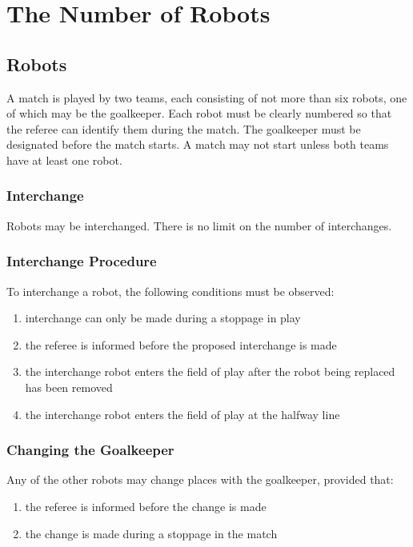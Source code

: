 \section{The Number of Robots}\label{sec:number-of-robots}

\subsection{Robots}
A match is played by two teams, each consisting of not more than six robots, one of which may be the goalkeeper.
Each robot must be clearly numbered so that the referee can identify them during the match.
The goalkeeper must be designated before the match starts.
A match may not start unless both teams have at least one robot.

\subsubsection{Interchange}
Robots may be interchanged.
There is no limit on the number of interchanges.

\subsubsection{Interchange Procedure}
To interchange a robot, the following conditions must be observed:
\begin{enumerate}
\item interchange can only be made during a stoppage in play
\item the referee is informed before the proposed interchange is made
\item the interchange robot enters the field of play after the robot being replaced has been removed
\item the interchange robot enters the field of play at the halfway line
\end{enumerate}

\subsubsection{Changing the Goalkeeper}
Any of the other robots may change places with the goalkeeper, provided that:
\begin{enumerate}
\item the referee is informed before the change is made
\item the change is made during a stoppage in the match
\end{enumerate}

